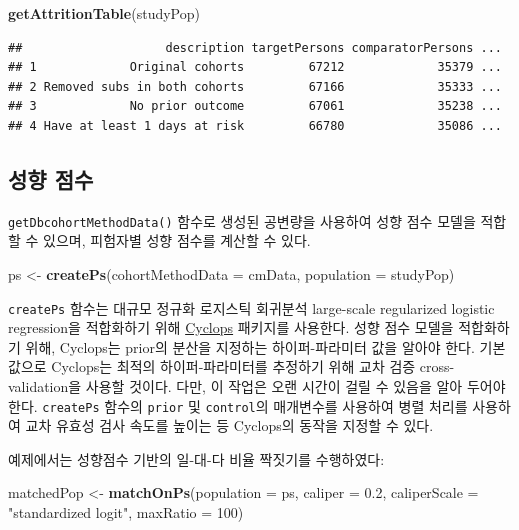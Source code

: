 \documentclass[10.5pt]{book}
\newenvironment{Shaded}{\begin{snugshade}}{\end{snugshade}}
\newcommand{\KeywordTok}[1]{\textcolor[rgb]{0.13,0.29,0.53}{\textbf{#1}}}
\newcommand{\DataTypeTok}[1]{\textcolor[rgb]{0.13,0.29,0.53}{#1}}
\newcommand{\DecValTok}[1]{\textcolor[rgb]{0.00,0.00,0.81}{#1}}
\newcommand{\FloatTok}[1]{\textcolor[rgb]{0.00,0.00,0.81}{#1}}
\newcommand{\StringTok}[1]{\textcolor[rgb]{0.31,0.60,0.02}{#1}}
\newcommand{\NormalTok}[1]{#1}
\theoremstyle{definition}
\theoremstyle{definition}
\theoremstyle{definition}
\theoremstyle{remark}
\begin{document}
\begin{Shaded}
\begin{Highlighting}[]
\KeywordTok{getAttritionTable}\NormalTok{(studyPop)}
\end{Highlighting}
\end{Shaded}

\begin{verbatim}
##                    description targetPersons comparatorPersons ...
## 1             Original cohorts         67212             35379 ...
## 2 Removed subs in both cohorts         67166             35333 ...
## 3             No prior outcome         67061             35238 ...
## 4 Have at least 1 days at risk         66780             35086 ...
\end{verbatim}

\subsection{성향 점수}\label{--1}

\texttt{getDbcohortMethodData()} 함수로 생성된 공변량을 사용하여 성향
점수 모델을 적합할 수 있으며, 피험자별 성향 점수를 계산할 수 있다.

\begin{Shaded}
\begin{Highlighting}[]
\NormalTok{ps <-}\StringTok{ }\KeywordTok{createPs}\NormalTok{(}\DataTypeTok{cohortMethodData =}\NormalTok{ cmData, }\DataTypeTok{population =}\NormalTok{ studyPop)}
\end{Highlighting}
\end{Shaded}

\texttt{createPs} 함수는 대규모 정규화 로지스틱 회귀분석 large-scale
regularized logistic regression을 적합화하기 위해
\href{https://ohdsi.github.io/Cyclops/}{Cyclops} 패키지를 사용한다. 성향
점수 모델을 적합화하기 위해, Cyclops는 prior의 분산을 지정하는
하이퍼-파라미터 값을 알아야 한다. 기본값으로 Cyclops는 최적의
하이퍼-파라미터를 추정하기 위해 교차 검증 cross-validation을 사용할
것이다. 다만, 이 작업은 오랜 시간이 걸릴 수 있음을 알아 두어야 한다.
\texttt{createPs} 함수의 \texttt{prior} 및 \texttt{control}의 매개변수를
사용하여 병렬 처리를 사용하여 교차 유효성 검사 속도를 높이는 등
Cyclops의 동작을 지정할 수 있다.

예제에서는 성향점수 기반의 일-대-다 비율 짝짓기를 수행하였다:

\begin{Shaded}
\begin{Highlighting}[]
\NormalTok{matchedPop <-}\StringTok{ }\KeywordTok{matchOnPs}\NormalTok{(}\DataTypeTok{population =}\NormalTok{ ps, }\DataTypeTok{caliper =} \FloatTok{0.2}\NormalTok{,}
                        \DataTypeTok{caliperScale =} \StringTok{"standardized logit"}\NormalTok{, }\DataTypeTok{maxRatio =} \DecValTok{100}\NormalTok{)}
\end{Highlighting}
\end{Shaded}
\end{document}
